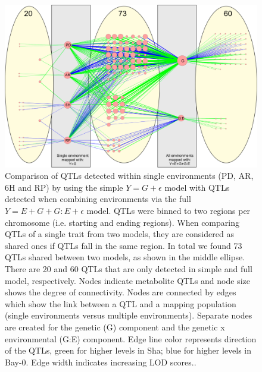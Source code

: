 \begin{figure}[h!]
  \centering
  \includegraphics[keepaspectratio,scale=0.30]{eps/image_3_2_2.eps}
  \caption[Comparison of QTLs detected]{Comparison of QTLs detected within single environments (PD, AR, 
          6H and RP) by using the simple $Y=G+\epsilon$ model with QTLs detected when combining environments via the full 
          $Y=E+G+G:E+\epsilon$ model. QTLs were binned to two regions per chromosome (i.e. starting and ending regions).  
          When comparing QTLs of a single trait from two models, they are considered as shared ones  if QTLs fall 
          in the same region. In total we found 73 QTLs shared between two models, as shown in the middle ellipse. 
          There are 20 and 60 QTLs that are only detected in simple and full model, respectively. Nodes indicate 
          metabolite QTLs and node size shows the degree of connectivity. Nodes are connected by edges which show 
          the link between a QTL and a mapping population (single environments versus multiple environments). 
          Separate nodes are created for the genetic (G) component and the genetic x environmental (G:E) component. 
          Edge line color represents direction of the QTLs, green for higher levels in Sha; blue for higher levels 
          in Bay-0. Edge width indicates increasing LOD scores..}
\end{figure}

